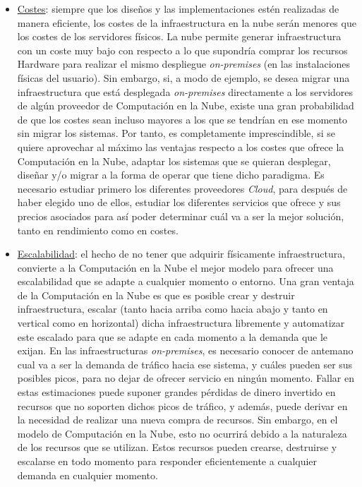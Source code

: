 \documentclass[../../memoria.tex]{subfiles}
\begin{document}
\begin{itemize}
    \item \uline{Costes}: siempre que los diseños y las implementaciones estén realizadas de manera eficiente, los costes de la infraestructura en la nube serán menores que los costes de los servidores físicos. La nube permite generar infraestructura con un coste muy bajo con respecto a lo que supondría comprar los recursos Hardware para realizar el mismo despliegue \textit{on-premises} (en las instalaciones físicas del usuario). Sin embargo, si, a modo de ejemplo, se desea migrar una infraestructura que está desplegada \textit{on-premises} directamente a los servidores de algún proveedor de Computación en la Nube, existe una gran probabilidad de que los costes sean incluso mayores a los que se tendrían en ese momento sin migrar los sistemas. Por tanto, es completamente imprescindible, si se quiere aprovechar al máximo las ventajas respecto a los costes que ofrece la Computación en la Nube, adaptar los sistemas que se quieran desplegar, diseñar y/o migrar a la forma de operar que tiene dicho paradigma. Es necesario estudiar primero los diferentes proveedores \textit{Cloud}, para después de haber elegido uno de ellos, estudiar los diferentes servicios que ofrece y sus precios asociados para así poder determinar cuál va a ser la mejor solución, tanto en rendimiento como en costes.

    \item \uline{Escalabilidad}: el hecho de no tener que adquirir físicamente infraestructura, convierte a la Computación en la Nube el mejor modelo para ofrecer una escalabilidad que se adapte a cualquier momento o entorno. Una gran ventaja de la Computación en la Nube es que es posible crear y destruir infraestructura, escalar (tanto hacia arriba como hacia abajo y tanto en vertical como en horizontal) dicha infraestructura libremente y automatizar este escalado para que se adapte en cada momento a la demanda que le exijan. En las infraestructuras \textit{on-premises}, es necesario conocer de antemano cual va a ser la demanda de tráfico hacia ese sistema, y cuáles pueden ser sus posibles picos, para no dejar de ofrecer servicio en ningún momento. Fallar en estas estimaciones puede suponer grandes pérdidas de dinero invertido en recursos que no soporten dichos picos de tráfico, y además, puede derivar en la necesidad de realizar una nueva compra de recursos. Sin embargo, en el modelo de Computación en la Nube, esto no ocurrirá debido a la naturaleza de los recursos que se utilizan. Estos recursos pueden crearse, destruirse y escalarse en todo momento para responder eficientemente a cualquier demanda en cualquier momento.


\end{itemize}
\end{document}
